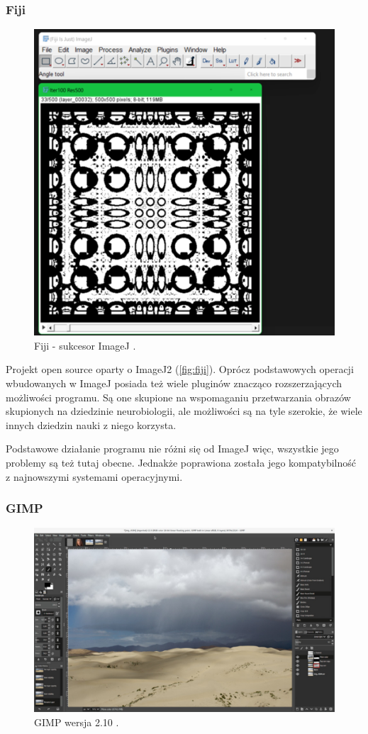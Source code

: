 \subsubsection{Fiji}
\begin{figure}[H]
    \centering
    \includegraphics[width=0.8\linewidth]{./images/Picture4.jpg}
    \caption{Fiji - sukcesor ImageJ \cite{fiji}.}
    \label{fig:fiji}
\end{figure}

Projekt open source oparty o ImageJ2 (\autoref{fig:fiji}). Oprócz podstawowych operacji wbudowanych w ImageJ posiada też wiele pluginów znacząco rozszerzających możliwości programu. 
Są one skupione na wspomaganiu przetwarzania obrazów skupionych na dziedzinie neurobiologii, ale możliwości są na tyle szerokie, że wiele innych dziedzin nauki z niego korzysta.

Podstawowe działanie programu nie różni się od ImageJ więc, wszystkie jego problemy są też tutaj obecne. Jednakże poprawiona została jego kompatybilność z najnowszymi systemami operacyjnymi.

\subsubsection{GIMP}
\begin{figure}[H]
    \centering
    \includegraphics{./images/Picture5.jpg}
    \caption{GIMP wersja 2.10 \cite{gimp}.}
    \label{fig:gimp}
\end{figure}

